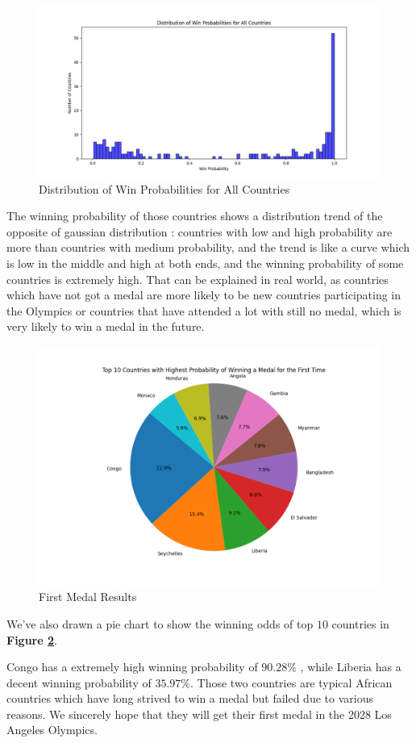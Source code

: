 \begin{figure}[h]
    \centering
    \includegraphics[width=1.1\textwidth]{../figures/win_probability_distribution.png}
    \caption{Distribution of Win Probabilities for All Countries}
    \label{fig:win_probability_distribution}
\end{figure}

The winning probability of those countries shows a distribution trend of the opposite of gaussian distribution : countries with low and high probability are more than countries with medium probability, and the trend is like a curve which is low in the middle and high at both ends, and the winning probability of some countries is extremely high. That can be explained in real world, as countries which have not got a medal are more likely to be new countries participating in the Olympics or countries that have attended a lot with still no medal, which is very likely to win a medal in the future. 
\begin{figure}[h]
    \centering
    \includegraphics[width=1.1\textwidth]{../figures/first_medal_pie.png}
    \caption{First Medal Results}
    \label{fig:first_medal_pie}
\end{figure}

We've also drawn a pie chart to show the winning odds of top $10$ countries in \textbf{Figure \ref{fig:first_medal_pie}}. 

Congo has a extremely high winning probability of $90.28\%$ , while Liberia has a decent winning probability of $35.97\%$. Those two countries are typical African countries which have long strived to win a medal but failed due to various reasons. We sincerely hope that they will get their first medal in the 2028 Los Angeles Olympics.